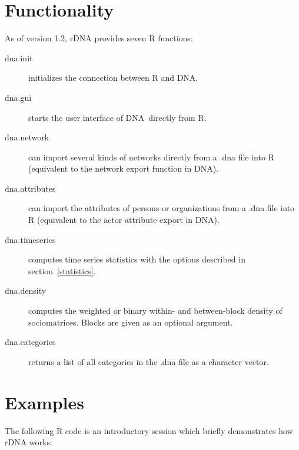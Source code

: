 \documentclass[12pt,a4paper]{scrreprt}
\newcommand{\dnashort}{\textsc{DNA}}
\begin{document}
\section{Functionality}
As of version 1.2, rDNA provides seven R functions:
\begin{description}
 \item[dna.init] initializes the connection between R and \dnashort.
 \item[dna.gui] starts the user interface of \dnashort\ directly from R.
 \item[dna.network] can import several kinds of networks directly from a .dna file into R (equivalent to the network export function in \dnashort).
 \item[dna.attributes] can import the attributes of persons or organizations from a .dna file into R (equivalent to the actor attribute export in \dnashort).
 \item[dna.timeseries] computes time series statistics with the options described in section~\ref{statistics}.
 \item[dna.density] computes the weighted or binary within- and between-block density of sociomatrices. Blocks are given as an optional argument.
 \item[dna.categories] returns a list of all categories in the .dna file as a character vector.
\end{description}

\section{Examples}
The following R code is an introductory session which briefly demonstrates how rDNA works:

\end{document}
